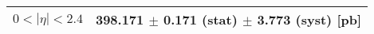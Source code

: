 \begin{tabular}{lc}
\hline
\hline
$0 < |\eta| <2.4$              & 398.171 $\pm$ 0.171 (stat) $\pm$ 3.773 (syst) [pb]  \\
\hline
\hline
\end{tabular}
